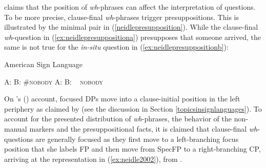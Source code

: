 \citet{neidle2002language} claims that the position of \textit{wh}-phrases can affect the interpretation of questions. To be more precise, clause-final \textit{wh}-phrases trigger presuppositions. This is illustrated by the minimal pair in (\ref{neidlepresupposition}). While the clause-final \textit{wh}-question in (\ref{ex:neidlepresuppositiona}) presupposes that someone arrived, the same is not true for the \textit{in-situ} question in (\ref{ex:neidlepresuppositionb}):

\begin{exe}
\ex American Sign Language \citep{neidle2002language}\label{neidlepresupposition}\begin{xlist} %
\ex A: 
\glt B: \#\textsc{nobody} \label{ex:neidlepresuppositiona} 
\ex A: 
\glt B: \textcolor{white}{\#}\textsc{nobody} \label{ex:neidlepresuppositionb} 
\end{xlist}
\end{exe}

\noindent On \citeauthor{neidle2002language}'s (\citeyear{neidle2002language}) account, focused DPs move into a clause-initial position in the left periphery as claimed by \citet{aarons1996topics} (see the discussion in Section \ref{topicsinsignlanguages}). To account for the presented distribution of \textit{wh}-phrases, the behavior of the non-manual markers and the presuppositional facts, it is claimed that clause-final \textit{wh}-questions are generally focused as they first move to a left-branching focus position that she labels FP and then move from SpecFP to a right-branching CP, arriving at the representation in (\ref{ex:neidle2002}), from \citet[82]{neidle2002language}.

\begin{exe}
\ex\label{ex:neidle2002} 
\end{exe}

